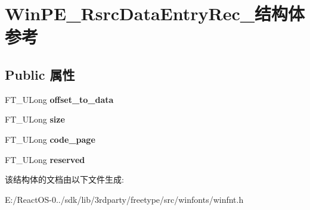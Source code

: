 \hypertarget{struct_win_p_e___rsrc_data_entry_rec__}{}\section{Win\+P\+E\+\_\+\+Rsrc\+Data\+Entry\+Rec\+\_\+结构体 参考}
\label{struct_win_p_e___rsrc_data_entry_rec__}
\subsection*{Public 属性}
\begin{DoxyCompactItemize}
\item 
\mbox{\label{struct_win_p_e___rsrc_data_entry_rec___ae6d388df33d62ceaeae061aa164e5312}} 
F\+T\+\_\+\+U\+Long {\bfseries offset\+\_\+to\+\_\+data}
\item 
\mbox{\label{struct_win_p_e___rsrc_data_entry_rec___a091e92b79926438c44f868e1dbe69c32}} 
F\+T\+\_\+\+U\+Long {\bfseries size}
\item 
\mbox{\label{struct_win_p_e___rsrc_data_entry_rec___a09db0df062bc15f6e986c4c6a4367efd}} 
F\+T\+\_\+\+U\+Long {\bfseries code\+\_\+page}
\item 
\mbox{\label{struct_win_p_e___rsrc_data_entry_rec___ae8edd0f39e1e107052bd4fc876ea4a85}} 
F\+T\+\_\+\+U\+Long {\bfseries reserved}
\end{DoxyCompactItemize}


该结构体的文档由以下文件生成\+:\begin{DoxyCompactItemize}
\item 
E\+:/\+React\+O\+S-\/0../sdk/lib/3rdparty/freetype/src/winfonts/winfnt.\+h\end{DoxyCompactItemize}
